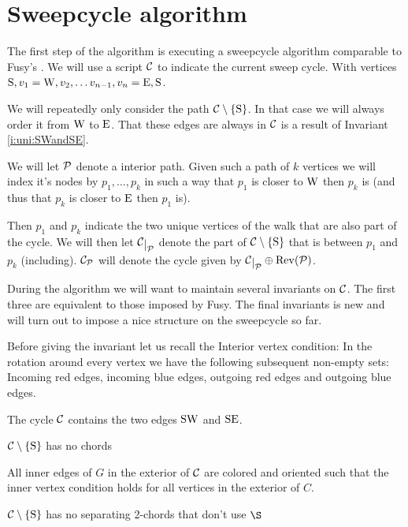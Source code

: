 
\section{Sweepcycle algorithm}
  \label{s:sweep}
  The first step of the algorithm is executing a sweepcycle algorithm comparable to Fusy's \cite{Fusy2006}. We will use a script $\C$ to indicate the current sweep cycle. With vertices $\pS, v_1 = \pW, v_2, \ldots v_{n-1}, v_n = \pE, \pS$.

  We will repeatedly only consider the path $\cpath$. In that case we will always order it from $\pW$ to $\pE$. That these edges are always in $\C$ is a result of Invariant \ref{i:uni:SWandSE}.

  We will let $\P$ denote a interior path. Given such a path of $k$ vertices we will index it's nodes by $p_1, \ldots, p_k$ in such a way that $p_1$ is closer to $\pW$ then $p_k$ is (and thus that $p_k$ is closer to $\pE$ then $p_1$ is).

  Then $p_1$ and $p_k$ indicate the two unique vertices of the walk that are also part of the cycle. We will then let $\restC{\P}$ denote the part of $\cpath$ that is between $p_1$ and $p_k$ (including). $\C_\P$ will denote the cycle given by $\restC{\P} \oplus \rev(\P)$.

  During the algorithm we will want to maintain several invariants on $\C$. The first three are equivalent to those imposed by Fusy. The final invariants is new and will turn out to impose a nice structure on the sweepcycle so far.

  Before giving the invariant let us recall the Interior vertex condition: In the rotation around every vertex we have the following subsequent non-empty sets: Incoming red edges, incoming blue edges, outgoing red edges and outgoing blue edges.

  \begin{invariants}
    \itemsep=-4pt

    \item \label{i:uni:SWandSE} The cycle $\C$ contains the two edges $\pS \pW$ and $\pS \pE$.
    \item \label{i:uni:noChords} $\cpath$ has no chords
    \item \label{i:uni:intVertCond} All inner edges of $G$ in the exterior of $\C$ are colored and oriented such that the inner vertex condition holds for all vertices in the exterior of $C$.
    \item \label{i:uni:no2Chords} $\C\sm{\pS}$ has no separating 2-chords that don't use $\S$
  \end{invariants}


